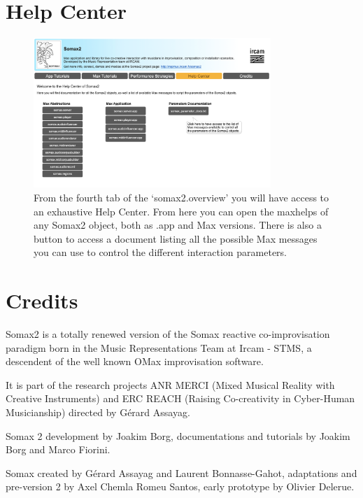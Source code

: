 \section{Help Center}

\begin{figure}[H]
    \centering        
 	\includegraphics[width=0.8\textwidth]{img/help_center.png}
    \caption{From the fourth tab of the `somax2.overview' you will have access to an exhaustive Help Center. From here you can open the maxhelps of any Somax2 object, both as .app and Max versions. There is also a button to access a document listing all the possible Max messages you can use to control the different interaction parameters.}
    \label{fig:help_center}
\end{figure}


\newpage
\section{Credits}

Somax2 is a totally renewed version of the Somax reactive co-improvisation paradigm born in the Music Representations Team at Ircam - STMS, a descendent of the well known OMax improvisation software.

It is  part of the research projects ANR MERCI (Mixed Musical Reality with Creative Instruments) and ERC REACH (Raising Co-creativity in Cyber-Human Musicianship) directed by Gérard Assayag.

\vspace{5mm}

\noindent Somax 2  development by Joakim Borg, documentations and tutorials by Joakim Borg and Marco Fiorini.

Somax  created  by Gérard Assayag and Laurent Bonnasse-Gahot, adaptations and pre-version 2 by Axel Chemla Romeu Santos, early prototype by Olivier Delerue.


